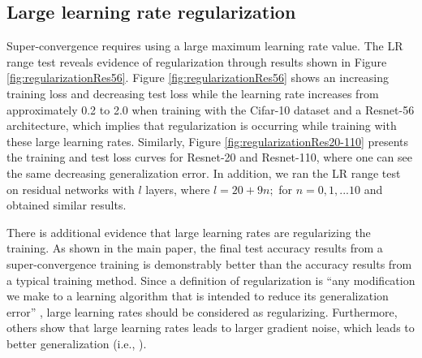\documentclass{article}
\begin{document}
	
	
	\subsection{Large learning rate regularization}
	
	Super-convergence requires using a large maximum learning rate value.
	The LR range test reveals evidence of regularization through results shown in Figure \ref{fig:regularizationRes56}.
	Figure \ref{fig:regularizationRes56} shows  an increasing training loss and decreasing test loss while the learning rate increases from approximately 0.2 to 2.0 when training with the Cifar-10 dataset and a Resnet-56 architecture, which implies that regularization is occurring while training with these large learning rates.
	Similarly, Figure \ref{fig:regularizationRes20-110} presents the training and test loss curves for Resnet-20 and Resnet-110, where one can see the same decreasing generalization error.
	In addition, we ran the LR range test on residual networks with $l$ layers, where $ l = 20 + 9 n;$ for $ n = 0, 1, ... 10$ and obtained similar results.
	
	There is additional evidence that large learning rates are regularizing the training.
	As shown in the main paper, the final test accuracy results from a super-convergence training is demonstrably better than the accuracy results from a typical training method.
	Since a definition of regularization is ``any modification we make to a learning algorithm that is intended to reduce its generalization error'' \citep{goodfellow2016deep}, large learning rates should be considered as regularizing.
	Furthermore, others show that large learning rates leads to larger gradient noise, which leads to better generalization (i.e., \cite{jastrzkebski2017three,smith2017don}).
	
	
\end{document}
